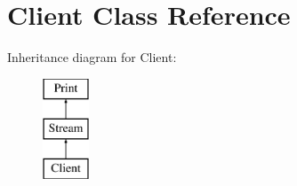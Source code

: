 \hypertarget{class_client}{\section{Client Class Reference}
\label{class_client}
}
Inheritance diagram for Client\-:\begin{figure}[H]
\begin{center}
\leavevmode
\includegraphics[height=3.000000cm]{class_client}
\end{center}
\end{figure}
